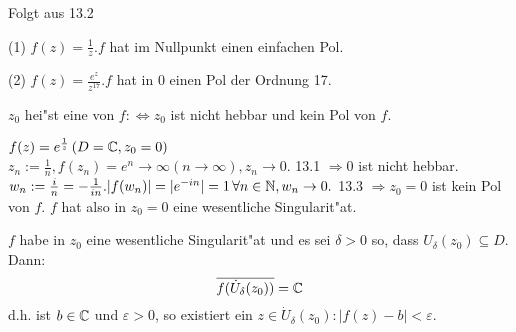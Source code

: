 \documentclass[a4paper,twoside,DIV15,BCOR12mm]{scrbook}
\begin{document}
\begin{beweis}
Folgt aus 13.2
\end{beweis}

\begin{beispiele}
\begin{liste}
\item[(1)] $f(z) = \frac1z. f$ hat im Nullpunkt einen einfachen Pol.
\item[(2)] $f(z) = \frac{e^z}{z^{17}}. f$ hat in $0$ einen Pol der Ordnung 17.
\end{liste}
\end{beispiele}

\begin{definition}
$z_0$ hei"st eine  von $f :\Leftrightarrow z_0$ ist nicht hebbar und kein Pol von $f$.
\end{definition}

\begin{beispiel}
$f(z) = e^{\frac1z} \, (D = \mathbb{C}, z_0=0)$\\
$z_n := \frac1n, f(z_n) = e^n \rightarrow \infty (n \rightarrow \infty), z_n \rightarrow 0.$ 13.1 $\Rightarrow 0$ ist nicht hebbar.\\
$w_n := \frac{i}n = - \frac1{in}. |f(w_n)| = | e^{-in} | = 1 \, \forall n \in \mathbb{N}, w_n \rightarrow 0.$ 13.3 $\Rightarrow z_0 = 0$ ist kein Pol von $f$. $f$ hat also in $z_0 = 0$ eine wesentliche Singularit"at.
\end{beispiel}

\begin{satz}
$f$ habe in $z_0$ eine wesentliche Singularit"at und es sei $\delta > 0$ so, dass $U_{\delta}(z_0) \subseteq D$. Dann:
\[
\overline{f(\dot{U}_{\delta}(z_0))} = \mathbb{C}
\]
d.h. ist $b \in \mathbb{C}$ und $\varepsilon > 0$, so existiert ein $z \in \dot{U}_{\delta}(z_0): |f(z) - b| < \varepsilon$.
\end{satz}
\end{document}
